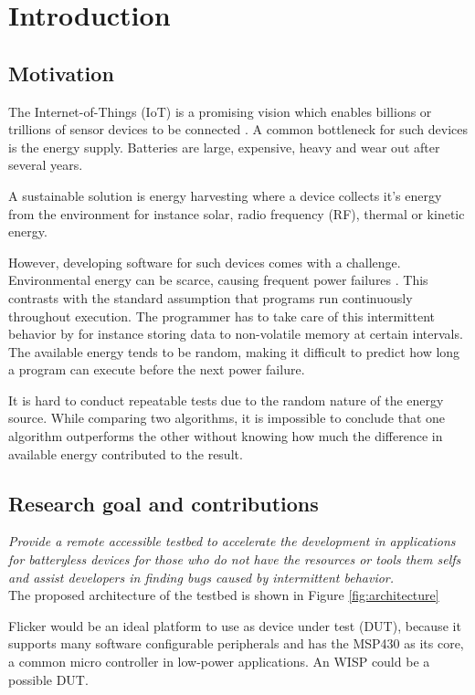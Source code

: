 \chapter{Introduction}
\label{chp:introduction}

\section{Motivation}
The Internet-of-Things (IoT) is a promising vision which enables billions or trillions of sensor devices to be connected \cite{flicker}. A common bottleneck for such devices is the energy supply. Batteries are large, expensive, heavy and wear out after several years.  %

A sustainable solution is energy harvesting where a device collects it's energy from the environment for instance solar, radio frequency (RF), thermal or kinetic energy.

However, developing software for such devices comes with a challenge. Environmental energy can be scarce, causing frequent power failures \cite{tpcthesis}. This contrasts with the standard assumption that programs run continuously throughout execution. The programmer has to take care of this intermittent behavior by for instance storing data to non-volatile memory at certain intervals. The available energy tends to be random, making it difficult to predict how long a program can execute before the next power failure. 

It is hard to conduct repeatable tests due to the random nature of the energy source. While comparing two algorithms, it is impossible to conclude that one algorithm outperforms the other without knowing how much the difference in available energy contributed to the result.

\section{Research goal and contributions}

\textit{Provide a remote accessible testbed to accelerate the development in applications for batteryless devices for those who do not have the resources or tools them selfs and assist developers in finding bugs caused by intermittent behavior.}\\

The proposed architecture of the testbed is shown in Figure \ref{fig:architecture}

Flicker \cite{flicker} would be an ideal platform to use as device under test (DUT), because it supports many software configurable peripherals and has the MSP430 as its core, a common micro controller in low-power applications. An WISP \cite{wisp} could be a possible DUT.

